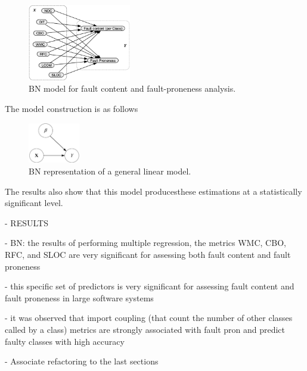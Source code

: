 \begin{figure}[htbp]
	\centerline{\includegraphics[width=0.4\textwidth]{pictures/bn2.png}}
	\caption{BN model for fault content and fault-proneness analysis.}
	\label{fig2bn}
\end{figure}

The model construction is as follows

\begin{figure}[htbp]
	\centerline{\includegraphics[width=0.2\textwidth]{pictures/bn1.png}}
	\caption{BN representation of a general linear model.}
	\label{fig1bn}
\end{figure}


The results also show that this model producesthese estimations at a statistically significant level.

- RESULTS 

- BN: the results of performing multiple regression, the metrics WMC, CBO, RFC, and SLOC are very significant for assessing both fault content and fault proneness

- this specific set of predictors is very significant for assessing fault content and fault proneness in large software systems

- it was observed that import coupling (that count the number of other classes called by a class) metrics are strongly associated with fault
pron and predict faulty classes with high accuracy

- Associate refactoring to the last sections
